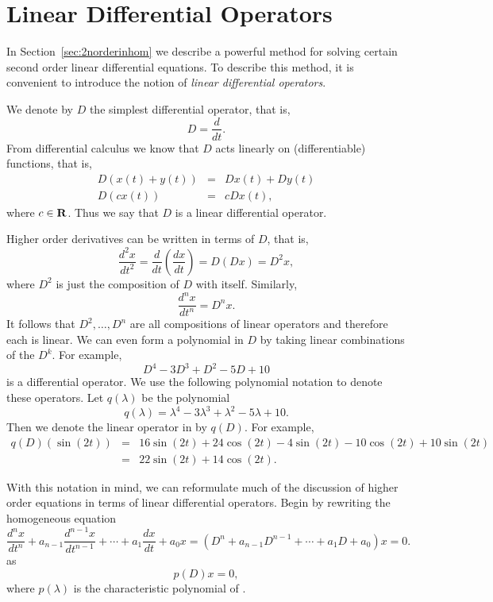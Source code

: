 \documentclass{ximera}
\begin{document}
\section{Linear Differential Operators}  
\label{S:LDO}

In Section~\ref{sec:2norderinhom} we describe a powerful method for 
solving certain second order linear differential equations.  To describe 
this method, it is convenient to introduce the notion of {\em linear 
differential operators}.

We denote by $D$ the simplest differential 
operator, that is,
\[
D=\frac{d}{dt}.
\]
From differential calculus we know that $D$ acts linearly on 
(differentiable) functions, that is,
\begin{eqnarray*}
D(x(t)+y(t)) & = & Dx(t) + Dy(t) \\
D(cx(t)) & = & cDx(t),
\end{eqnarray*}
where $c\in\mbox{$\bf{R}$}$.  Thus we say that $D$ is a linear differential operator.

Higher order derivatives can be written in terms of $D$, that is,
\[
\frac{d^2x}{dt^2} = \frac{d}{dt}\left(\frac{dx}{dt}\right) = D(Dx) = D^2x,
\]
where $D^2$ is just the composition of $D$ with itself.  Similarly, 
\[
\frac{d^nx}{dt^n} = D^nx.
\]
It follows that $D^2,\ldots,D^n$ are all compositions of linear operators
and therefore each is linear.  We can even form a polynomial in $D$ by taking
linear combinations of the $D^k$.  For example,
\begin{equation}  \label{E:pdo}
D^4 - 3D^3 + D^2 -5D + 10 
\end{equation}
is a differential operator.  
We use the following polynomial notation to 
denote these operators.  Let $q(\lambda)$ be the polynomial
\[
q(\lambda) = \lambda^4 -3\lambda^3 + \lambda^2 - 5\lambda +10.
\]
Then we denote the linear operator in  by $q(D)$.  For example,
\begin{eqnarray*}
q(D)(\sin(2t)) & = & 16\sin(2t) + 24\cos(2t) - 4\sin(2t) - 10\cos(2t) + 
10\sin(2t) \\ & = & 22\sin(2t) + 14\cos(2t).
\end{eqnarray*}


With this notation in mind, we can reformulate much of the discussion of 
higher order equations in terms of linear differential operators.  Begin by 
rewriting the homogeneous equation  
\[
\frac{d^nx}{dt^n}+a_{n-1}\frac{d^{n-1}x}{dt^{n-1}}+\cdots+
a_1\frac{dx}{dt}+a_0x = (D^n+a_{n-1}D^{n-1}+\cdots+a_1D+a_0)x = 0.
\]
as
\begin{equation}  \label{E:opern2}
p(D)x = 0,
\end{equation}
where $p(\lambda)$ is the characteristic 
polynomial 
of .
\end{document}
